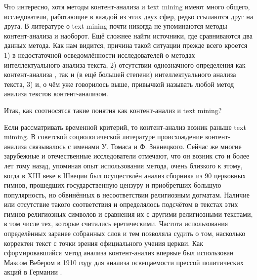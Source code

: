 Что интересно, хотя методы контент-анализа и text mining имеют много общего, исследователи, работающие в каждой из этих двух сфер, редко ссылаются друг на друга. В литературе о text mining почти никогда не упоминаются методы контент-анализа и наоборот. Ещё сложнее найти источники, где сравниваются два данных метода. Как нам видится, причина такой ситуации прежде всего кроется 1) в недостаточной осведомлённости исследователей о методах интеллектуального анализа текста, 2) отсутствии однозначного определения как контент-анализа \cite[стр. 156]{Lande2006}, так и (в ещё большей степени) интеллектуального анализа текста, 3) и, о чём уже говорилось выше, привычкой называть любой метод анализа текстов контент-анализом.


Итак, как соотносятся такие понятия как контент-анализ и text mining?

Если рассматривать временной критерий, то контент-анализ возник раньше text miming. В советской социологической литературе происхождение контент-анализа связывалось с именами У. Томаса и Ф. Знанецкого. Сейчас же многие зарубежные\cite{Smith2000} и отечественные\cite{Pochepcov1998} исследователи отмечают, что он возник сто и более лет тому назад, упоминая опыт использования метода, очень близкого к этому, когда в XIII веке в Швеции был осуществлён анализ сборника из 90 церковных гимнов, прошедших государственную цензуру и приобретших большую популярность, но обвинённых в несоответствии религиозным догматам. Наличие или отсутствие такого соответствия и определялось подсчётом в текстах этих гимнов религиозных символов и сравнения их с другими религиозными текстами, в том числе тех, которые считались еретическими. Частота использования определённых заранее собранных слов и тем позволяла судить о том, насколько корректен текст с точки зрения официального учения церкви. Как сформировавшийся метод анализа контент-анализ впервые был использован Максом Вебером в 1910 году для анализа освещаемости прессой политических акций в Германии \cite[стр. 155]{Lande2006}.

